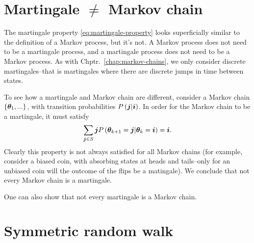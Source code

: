 \section{Martingale $\neq$ Markov chain}

The martingale property \eqref{eq:martingale-property} looks superficially similar to the definition of a Markov process, but it's not.
A Markov process does not need to be a martingale process, and a martingale process does not need to be a Markov process.
As with Chptr.~\ref{chap:markov-chains}, we only consider discrete martingales--that is martingales where there are discrete jumps in time between states.

To see how a martingale and Markov chain are different, consider a Markov chain $\{{\bm \theta}_1,...\}$, with transition probabilities $P\left({\bm j}|{\bm i}\right)$.
In order for the Markov chain to be a martingale, it must satisfy
\begin{align}
    \sum_{{\bm j}\in S}  {\bm j} P\left({\bm \theta}_{k+1}={\bm j}|{\bm \theta}_{k}={\bm i}\right) = {\bm i}
    .
\end{align}
Clearly this property is not always satisfied for all Markov chains (for example, consider a biased coin, with absorbing states at heads and tails--only for an unbiased coin will the outcome of the flips be a matingale).
We conclude that not every Markov chain is a martingale.

One can also show that not every martingale is a Markov chain.



\section{Symmetric random walk\label{sec:symmetric-random-walk}}

